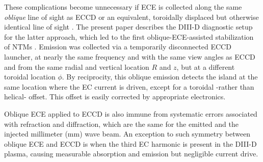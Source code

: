 \documentclass[aps,pra,twocolumn]{revtex4}
\begin{document}



These complications become unnecessary if ECE is collected along the same 
{\em oblique} line of sight as ECCD \cite{Ooster} 
or an equivalent, toroidally displaced but otherwise identical 
line of sight \cite{PoP}. The present paper describes the DIII-D diagnostic 
setup for the latter approach, which led to the first oblique-ECE-assisted 
stabilization of NTMs \cite{PoP}. Emission was collected via a 
temporarily disconnected ECCD launcher, at nearly the same frequency and with 
the same view angles as ECCD and from the same radial and vertical location 
$R$ and $z$, but at a different toroidal location $\phi$. 
By reciprocity, this oblique emission detects the island at the same location 
where the EC current is driven, except for a toroidal -rather than helical- 
offset. This offset is easily corrected by appropriate electronics. 

Oblique ECE applied to ECCD is also immune from
systematic errors associated with refraction and diffraction, which are 
the same for the emitted and the injected millimeter (mm) wave beam. 
An exception to such symmetry between oblique ECE and ECCD is when the
third EC harmonic is present in the DIII-D plasma, causing 
measurable absorption and emission but negligible current drive. 
\end{document}
